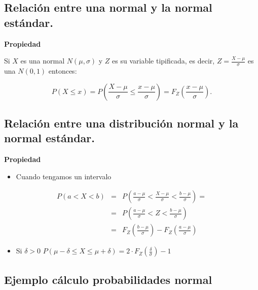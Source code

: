 \documentclass[]{book}
\providecommand{\tightlist}{%
  \setlength{\itemsep}{0pt}\setlength{\parskip}{0pt}}
\begin{document}
\hypertarget{relaciuxf3n-entre-una-normal-y-la-normal-estuxe1ndar.}{%
\subsection{Relación entre una normal y la normal estándar.}\label{relaciuxf3n-entre-una-normal-y-la-normal-estuxe1ndar.}}

\textbf{Propiedad}

Si \(X\) es una normal \(N(\mu,\sigma)\) y \(Z\) es su variable tipificada, es decir, \(Z=\frac{X-\mu}{\sigma}\) es una \(N(0,1)\) entonces:

\[
P(X\leq x)=P\left(\frac{X-\mu}{\sigma}\leq \frac{x-\mu}{\sigma}\right)=F_{Z}\left(\frac{x-\mu}{\sigma}\right).
\]

\hypertarget{relaciuxf3n-entre-una-distribuciuxf3n-normal-y-la-normal-estuxe1ndar.}{%
\subsection{Relación entre una distribución normal y la normal estándar.}\label{relaciuxf3n-entre-una-distribuciuxf3n-normal-y-la-normal-estuxe1ndar.}}

\textbf{Propiedad}

\begin{itemize}
\tightlist
\item
  Cuando tengamos un intervalo
\end{itemize}

\[
\begin{eqnarray*}
P(a<X<b)&=&P\left(\frac{a-\mu}{\sigma}<\frac{X-\mu}{\sigma}<\frac{b-\mu}{\sigma}\right)= \\
&=& P\left(\frac{a-\mu}{\sigma}<Z<\frac{b-\mu}{\sigma}\right)\\
&=&F_{Z}\left(\frac{b-\mu}{\sigma}\right)-
F_{Z}\left(\frac{a-\mu}{\sigma}\right)
\end{eqnarray*}
\]

\begin{itemize}
\tightlist
\item
  Si \(\delta>0\) \(P\left(\mu-\delta\leq X \leq\mu+\delta\right)=2\cdot F_Z\left(\frac{\delta}{\sigma}\right)-1\)
\end{itemize}

\hypertarget{ejemplo-cuxe1lculo-probabilidades-normal}{%
\subsection{Ejemplo cálculo probabilidades normal}\label{ejemplo-cuxe1lculo-probabilidades-normal}}
\end{document}
